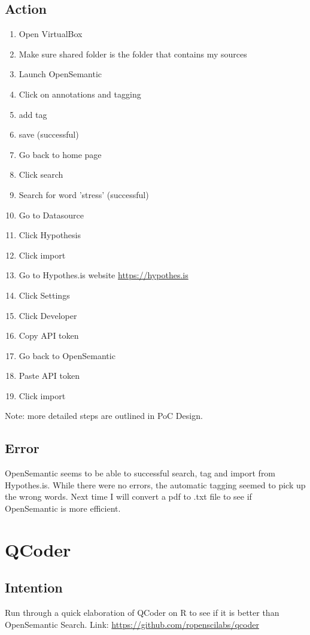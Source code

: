 \documentclass{article}
\begin{document}
\subsection{Action}
\begin{enumerate}
    \item Open VirtualBox
    \item Make sure shared folder is the folder that contains my sources
    \item Launch OpenSemantic 
    \item Click on annotations and tagging 
    \item add tag 
    \item save (successful)
    \item Go back to home page 
    \item Click search
    \item Search for word 'stress' (successful)
    \item Go to Datasource 
    \item Click Hypothesis
    \item Click import
    \item Go to Hypothes.is website \href{https://hypothes.is}{https://hypothes.is}
    \item Click Settings
    \item Click Developer
    \item Copy API token
    \item Go back to OpenSemantic
    \item Paste API token 
    \item Click import
\end{enumerate}
Note: more detailed steps are outlined in PoC Design.
\subsection{Error}
OpenSemantic seems to be able to successful search, tag and import from Hypothes.is. While there were no errors, the automatic tagging seemed to pick up the wrong words. Next time I will convert a pdf to .txt file to see if OpenSemantic is more efficient.

\section{QCoder}
\subsection{Intention}
Run through a quick elaboration of QCoder on R to see if it is better than OpenSemantic Search. Link: \href{https://github.com/ropenscilabs/qcoder}{https://github.com/ropenscilabs/qcoder}
\end{document}
